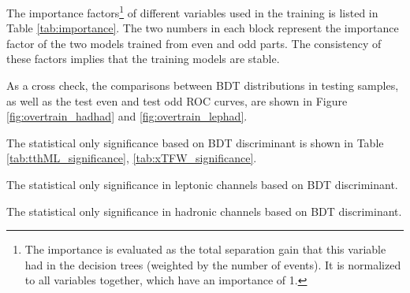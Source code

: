The importance factors\footnote{
The importance is evaluated as the total separation gain that this variable had in the decision trees (weighted by the number of events). It is normalized to all variables together, which have an importance of 1.
}
of different variables used in the training is listed in Table \ref{tab:importance}. The two numbers in each block represent the importance factor of the two models trained from even and odd parts. The consistency of these factors implies that the training models are stable.




As a cross check, the comparisons between BDT distributions in testing samples, as well as the test even and test odd ROC curves, are shown in Figure \ref{fig:overtrain_hadhad} and \ref{fig:overtrain_lephad}.



The statistical only significance based on BDT discriminant is shown in Table \ref{tab:tthML_significance}, \ref{tab:xTFW_significance}.

\begin{table}
\caption{The statistical only significance in leptonic channels based on BDT discriminant.}
\label{tab:tthML_significance}
%

%
\end{table}

\begin{table}
\caption{The statistical only significance in hadronic channels based on BDT discriminant.}
\label{tab:xTFW_significance}

\end{table}



